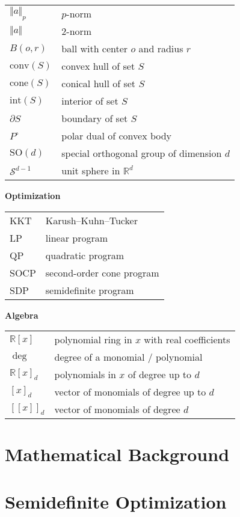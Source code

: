 \documentclass[
]{book}
\begin{document}
\begin{longtable}[]{@{}ll@{}}
\toprule()
\endhead
\(\Vert a \Vert_{p}\) & \(p\)-norm \\
\(\Vert a \Vert\) & \(2\)-norm \\
\(B(o,r)\) & ball with center \(o\) and radius \(r\) \\
\(\mathrm{conv}(S)\) & convex hull of set \(S\) \\
\(\mathrm{cone}(S)\) & conical hull of set \(S\) \\
\(\mathrm{int}(S)\) & interior of set \(S\) \\
\(\partial S\) & boundary of set \(S\) \\
\(P^\circ\) & polar dual of convex body \\
\(\mathrm{SO}(d)\) & special orthogonal group of dimension \(d\) \\
\(\mathcal{S}^{d-1}\) & unit sphere in \(\mathbb{R}^{d}\) \\
\bottomrule()
\end{longtable}

\textbf{Optimization}

\begin{longtable}[]{@{}ll@{}}
\toprule()
\endhead
KKT & Karush--Kuhn--Tucker \\
LP & linear program \\
QP & quadratic program \\
SOCP & second-order cone program \\
SDP & semidefinite program \\
\bottomrule()
\end{longtable}

\textbf{Algebra}

\begin{longtable}[]{@{}ll@{}}
\toprule()
\endhead
\(\mathbb{R}[x]\) & polynomial ring in \(x\) with real coefficients \\
\(\deg\) & degree of a monomial / polynomial \\
\(\mathbb{R}[x]_d\) & polynomials in \(x\) of degree up to \(d\) \\
\([x]_d\) & vector of monomials of degree up to \(d\) \\
\([\![x ]\!]_d\) & vector of monomials of degree \(d\) \\
\bottomrule()
\end{longtable}

\hypertarget{background}{%
\chapter{Mathematical Background}\label{background}}

\hypertarget{sdp}{%
\chapter{Semidefinite Optimization}\label{sdp}}

  
\end{document}
